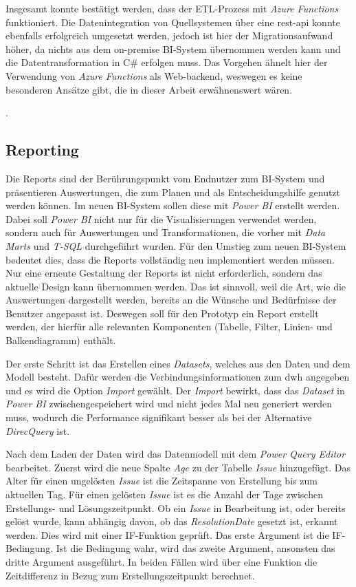 Insgesamt konnte bestätigt werden, dass der ETL-Prozess mit \textit{Azure Functions} funktioniert. Die Datenintegration von Quellsystemen über eine \ac{rest}-\ac{api} konnte ebenfalls erfolgreich umgesetzt werden, jedoch ist hier der Migrationsaufwand höher, da nichts aus dem on-premise BI-System übernommen werden kann und die Datentransformation in C\# erfolgen muss. Das Vorgehen ähnelt hier der Verwendung von \textit{Azure Functions} als Web-backend, weswegen es keine besonderen Ansätze gibt, die in dieser Arbeit erwähnenswert wären.

\cite[vgl.][]{kurniawan_practical_2019, satapathi_hands-azure_2021, sreeram_azure_2020}.

\subsection{Reporting}
Die Reports sind der Berührungspunkt vom Endnutzer zum BI-System und präsentieren Auswertungen, die zum Planen und als Entscheidungshilfe genutzt werden können. Im neuen BI-System sollen diese mit \textit{Power BI} erstellt werden. Dabei soll \textit{Power BI} nicht nur für die Visualisierungen verwendet werden, sondern auch für Auswertungen und Transformationen, die vorher mit \textit{Data Marts} und \textit{T-SQL} durchgeführt wurden. Für den Umstieg zum neuen BI-System bedeutet dies, dass die Reports vollständig neu implementiert werden müssen. Nur eine erneute Gestaltung der Reports ist nicht erforderlich, sondern das aktuelle Design kann übernommen werden. Das ist sinnvoll, weil die Art, wie die Auswertungen dargestellt werden, bereits an die Wünsche und Bedürfnisse der Benutzer angepasst ist. Deswegen soll für den Prototyp ein Report erstellt werden, der hierfür alle relevanten Komponenten (Tabelle, Filter, Linien- und Balkendiagramm) enthält.

Der erste Schritt ist das Erstellen eines \textit{Datasets}, welches aus den Daten und dem Modell besteht. Dafür werden die Verbindungsinformationen zum \ac{dwh} angegeben und es wird die Option \textit{Import} gewählt. Der \textit{Import} bewirkt, dass das \textit{Dataset} in \textit{Power BI} zwischengespeichert wird und nicht jedes Mal neu generiert werden muss, wodurch die Performance signifikant besser als bei der Alternative \textit{DirecQuery} ist.

Nach dem Laden der Daten wird das Datenmodell mit dem \textit{Power Query Editor} bearbeitet. Zuerst wird die neue Spalte \textit{Age} zu der Tabelle \textit{Issue} hinzugefügt. Das Alter für einen ungelösten \textit{Issue} ist die Zeitspanne von Erstellung bis zum aktuellen Tag. Für einen gelösten \textit{Issue} ist es die Anzahl der Tage zwischen Erstellungs- und Lösungszeitpunkt. Ob ein \textit{Issue} in Bearbeitung ist, oder bereits gelöst wurde, kann abhängig davon, ob das \textit{ResolutionDate} gesetzt ist, erkannt werden. Dies wird mit einer IF-Funktion geprüft. Das erste Argument ist die IF-Bedingung. Ist die Bedingung wahr, wird das zweite Argument, ansonsten das dritte Argument ausgeführt. In beiden Fällen wird über eine Funktion die Zeitdifferenz in Bezug zum Erstellungszeitpunkt berechnet.

